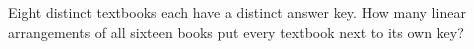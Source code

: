 Eight distinct textbooks each have a distinct answer key. How many linear arrangements of all sixteen books put every textbook next to its own key?
